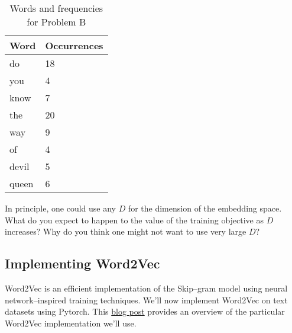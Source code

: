 \begin{table}[]
\centering
\caption{Words and frequencies for Problem B}
\begin{tabular}{|l|l|}
\hline
Word  & Occurrences \\ \hline
do    & 18          \\
you   & 4           \\
know  & 7           \\
the   & 20          \\
way   & 9          \\
of    & 4           \\
devil & 5           \\
queen & 6           \\ \hline
\end{tabular}
\end{table}

\begin{solution}



\end{solution}


\problem[3]
In principle, one could use any $D$ for the dimension of the embedding space.  What do you expect to happen to the value of the training objective as $D$ increases?  Why do you think one might not want to use very large $D$?

\begin{solution}



\end{solution}

\subsection{Implementing Word2Vec}
Word2Vec is an efficient implementation of the Skip--gram model using neural network--inspired training techniques. We'll now implement Word2Vec on text datasets using Pytorch.  This  
\href{http://mccormickml.com/2016/04/19/word2vec-tutorial-the-skip-gram-model/}{blog post} provides an overview of the particular Word2Vec implementation we'll use.

